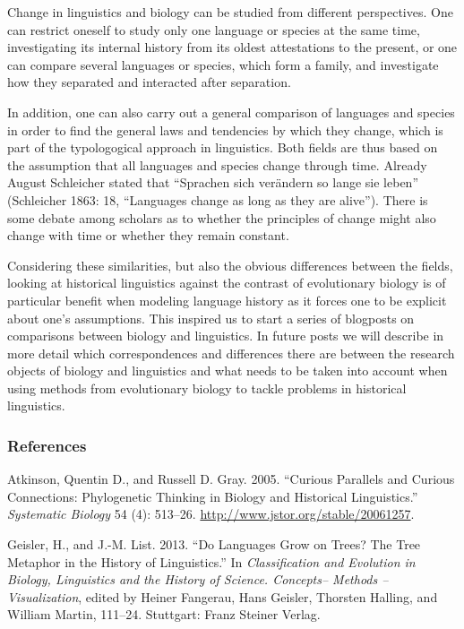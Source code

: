 \documentclass[
  a4paper,
  14pt,
  oneside,
  tablecaptionabove
]{scrbook}
\begin{document}
Change in linguistics and biology can be studied from different
perspectives. One can restrict oneself to study only one language or
species at the same time, investigating its internal history from its
oldest attestations to the present, or one can compare several languages
or species, which form a family, and investigate how they separated and
interacted after separation.

In addition, one can also carry out a general comparison of languages
and species in order to find the general laws and tendencies by which
they change, which is part of the typologogical approach in linguistics.
Both fields are thus based on the assumption that all languages and
species change through time. Already August Schleicher stated that
\enquote{Sprachen sich verändern so lange sie leben} (Schleicher 1863:
18, \enquote{Languages change as long as they are alive}). There is some
debate among scholars as to whether the principles of change might also
change with time or whether they remain constant.

Considering these similarities, but also the obvious differences between
the fields, looking at historical linguistics against the contrast of
evolutionary biology is of particular benefit when modeling language
history as it forces one to be explicit about one's assumptions. This
inspired us to start a series of blogposts on comparisons between
biology and linguistics. In future posts we will describe in more detail
which correspondences and differences there are between the research
objects of biology and linguistics and what needs to be taken into
account when using methods from evolutionary biology to tackle problems
in historical linguistics.

\newpage
\subsubsection*{References}

\nopagebreak\hangindent=0.7cm {\small  Atkinson, Quentin D., and Russell D. Gray. 2005. \enquote{Curious
Parallels and Curious Connections: Phylogenetic Thinking in Biology and
Historical Linguistics.} \emph{Systematic Biology} 54 (4): 513--26.
\url{http://www.jstor.org/stable/20061257}. }

\nopagebreak\hangindent=0.7cm {\small  Geisler, H., and J.-M. List. 2013. \enquote{Do Languages Grow on
Trees? The Tree Metaphor in the History of Linguistics.} In
\emph{Classification and Evolution in Biology, Linguistics and the
History of Science. Concepts-- Methods -- Visualization}, edited by
Heiner Fangerau, Hans Geisler, Thorsten Halling, and William Martin,
111--24. Stuttgart: Franz Steiner Verlag.}
\end{document}
